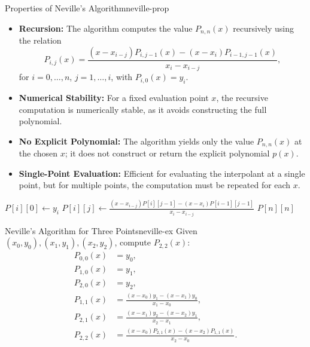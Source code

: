 \begin{property}{Properties of Neville's Algorithm}{neville-prop}
    \begin{itemize}[nosep]
        \item \textbf{Recursion:} The algorithm computes the value \(P_{n,n}(x)\) recursively using the relation
              \[
                  P_{i,j}(x) = \frac{(x - x_{i-j}) P_{i,j-1}(x) - (x - x_i) P_{i-1,j-1}(x)}{x_i - x_{i-j}},
              \]
              for \(i=0,\ldots,n\), \(j=1,\ldots,i\), with \(P_{i,0}(x) = y_i\).
        \item \textbf{Numerical Stability:} For a fixed evaluation point \(x\), the recursive computation is numerically stable, as it avoids constructing the full polynomial.
        \item \textbf{No Explicit Polynomial:} The algorithm yields only the value \(P_{n,n}(x)\) at the chosen \(x\); it does not construct or return the explicit polynomial \(p(x)\).
        \item \textbf{Single-Point Evaluation:} Efficient for evaluating the interpolant at a single point, but for multiple points, the computation must be repeated for each \(x\).
    \end{itemize}
\end{property}

\begin{algorithm}[H]
    \caption{Neville's Algorithm}
    \begin{algorithmic}[1]
        \State \(P[i][0] \gets y_i\)
        \EndFor
        \State \(P[i][j] \gets \frac{(x - x_{i-j}) P[i][j-1] - (x - x_i) P[i-1][j-1]}{x_i - x_{i-j}}\)
        \EndFor
        \EndFor
        \State \Return \(P[n][n]\)
    \end{algorithmic}
\end{algorithm}

\begin{example}{Neville's Algorithm for Three Points}{neville-ex}
    Given \((x_0, y_0), (x_1, y_1), (x_2, y_2)\), compute \(P_{2,2}(x)\):
    \begin{align*}
        P_{0,0}(x) & = y_0,                                                   \\
        P_{1,0}(x) & = y_1,                                                   \\
        P_{2,0}(x) & = y_2,                                                   \\
        P_{1,1}(x) & = \frac{(x-x_0)y_1 - (x-x_1)y_0}{x_1-x_0},               \\
        P_{2,1}(x) & = \frac{(x-x_1)y_2 - (x-x_2)y_1}{x_2-x_1},               \\
        P_{2,2}(x) & = \frac{(x-x_0)P_{2,1}(x) - (x-x_2)P_{1,1}(x)}{x_2-x_0}.
    \end{align*}
\end{example}

